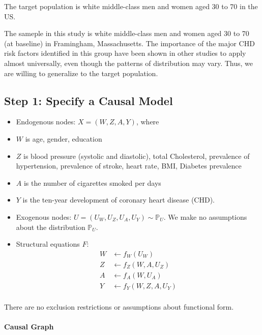 \documentclass[]{article}
\let\oldparagraph\paragraph
\renewcommand{\paragraph}[1]{\oldparagraph{#1}\mbox{}}
\begin{document}
The target population is white middle-class men and women aged 30 to 70
in the US.

The sameple in this study is white middle-class men and women aged 30 to
70 (at baseline) in Framingham, Massachusetts. The importance of the
major CHD risk factors identified in this group have been shown in other
studies to apply almost universally, even though the patterns of
distribution may vary. Thus, we are willing to generalize to the target
population.

\hypertarget{step-1-specify-a-causal-model}{%
\subsection{Step 1: Specify a Causal
Model}\label{step-1-specify-a-causal-model}}

\begin{itemize}
\item
  Endogenous nodes: \(X = (W,Z,A,Y)\), where
\item
  \(W\) is age, gender, education
\item
  \(Z\) is blood pressure (systolic and diastolic), total Cholesterol,
  prevalence of hypertension, prevalence of stroke, heart rate, BMI,
  Diabetes prevalence
\item
  \(A\) is the number of cigarettes smoked per days
\item
  \(Y\) is the ten-year development of coronary heart disease (CHD).
\item
  Exogenous nodes: \(U = (U_{W}, U_{Z}, U_A , U_Y) \sim \mathbb{P}_U\).
  We make no assumptions about the distribution \(\mathbb{P}_U\).
\item
  Structural equations \(F\): \[
  \begin{aligned}
  W &\leftarrow  f_W (U_W) \\
  Z  &\leftarrow  f_Z (W, A, U_Z) \\
  A  &\leftarrow  f_A (W, U_A) \\
  Y  &\leftarrow  f_Y (W, Z, A, U_Y) \\
  \end{aligned}
  \]
\end{itemize}

There are no exclusion restrictions or assumptions about functional
form.

\hypertarget{causal-graph}{%
\paragraph{Causal Graph}\label{causal-graph}}
\end{document}
